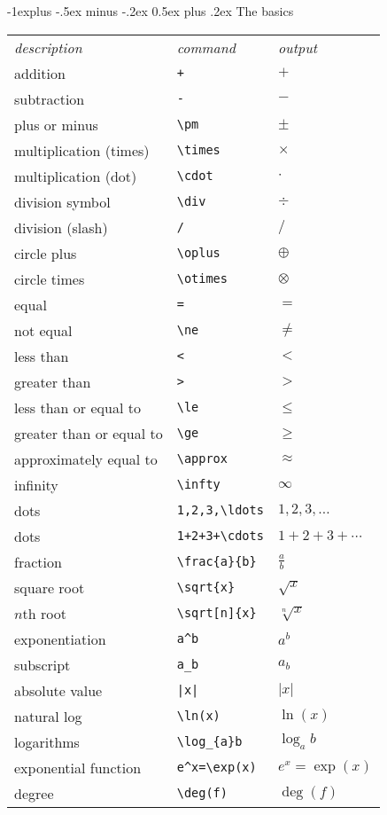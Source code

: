 \documentclass[10pt]{article}
\makeatletter
\renewcommand{\subsection}{\@startsection{subsection}{2}{0mm}%
                                {-1explus -.5ex minus -.2ex}%
                                {0.5ex plus .2ex}%
                                {\normalfont\normalsize\bfseries}}
\makeatother
\begin{document}
\begin{multicols}{1}
\subsection{The basics}
\begin{tabular}{lll}
\emph{description} & \emph{command} & \emph{output}\\
addition & \verb!+! & $+$\\
subtraction & \verb!-! & $-$\\
plus or minus & \verb!\pm! & $\pm$\\
multiplication (times) & \verb!\times! & $\times$\\
multiplication (dot) & \verb!\cdot! & $\cdot$\\
division symbol & \verb!\div! & $\div$\\
division (slash) & \verb!/! & $/$\\
circle plus & \verb!\oplus! & $\oplus$\\
circle times & \verb!\otimes! & $\otimes$\\
equal & \verb!=! & $=$\\
not equal & \verb!\ne! & $\ne$\\
less than & \verb!<! & $<$\\
greater than & \verb!>! & $>$\\
less than or equal to & \verb!\le! & $\le$\\
greater than or equal to & \verb!\ge! & $\ge$\\
approximately equal to & \verb!\approx! & $\approx$\\
infinity & \verb!\infty! & $\infty$\\
dots & \verb!1,2,3,\ldots! & $1,2,3,\ldots$\\
dots & \verb!1+2+3+\cdots! & $1+2+3+\cdots$\\
fraction & \verb!\frac{a}{b}! & $\frac{a}{b}$\\
square root & \verb!\sqrt{x}! & $\sqrt{x}$\\
$n$th root & \verb!\sqrt[n]{x}! & $\sqrt[n]{x}$\\
exponentiation & \verb!a^b! & $a^{b}$\\
subscript & \verb!a_b! & $a_{b}$\\
absolute value & \verb!|x|! & $|x|$\\
natural log  & \verb!\ln(x)! & $\ln(x)$\\
logarithms & \verb!\log_{a}b! & $\log_{a}b$\\
exponential function & \verb!e^x=\exp(x)! & $e^{x}=\exp(x)$\\
degree & \verb!\deg(f)! & $\deg(f)$\\
\end{tabular}
\newpage


\end{multicols}
\end{document}
